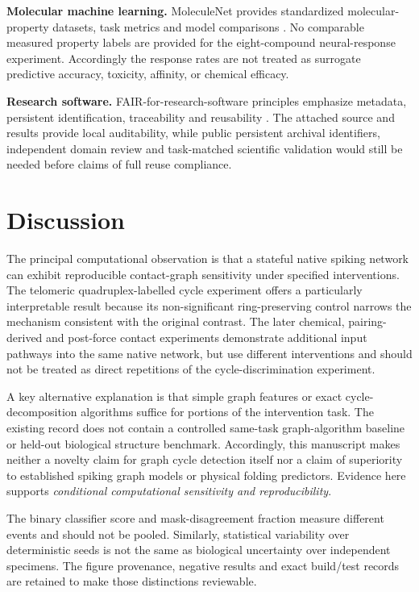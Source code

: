 \documentclass[10pt,a4paper]{article}
\begin{document}
\textbf{Molecular machine learning.} MoleculeNet provides standardized molecular-property datasets, task metrics and model comparisons \cite{MoleculeNet}. No comparable measured property labels are provided for the eight-compound neural-response experiment. Accordingly the response rates are not treated as surrogate predictive accuracy, toxicity, affinity, or chemical efficacy.

\textbf{Research software.} FAIR-for-research-software principles emphasize metadata, persistent identification, traceability and reusability \cite{FAIR4RS}. The attached source and results provide local auditability, while public persistent archival identifiers, independent domain review and task-matched scientific validation would still be needed before claims of full reuse compliance.

\section{Discussion}
The principal computational observation is that a stateful native spiking network can exhibit reproducible contact-graph sensitivity under specified interventions. The telomeric quadruplex-labelled cycle experiment offers a particularly interpretable result because its non-significant ring-preserving control narrows the mechanism consistent with the original contrast. The later chemical, pairing-derived and post-force contact experiments demonstrate additional input pathways into the same native network, but use different interventions and should not be treated as direct repetitions of the cycle-discrimination experiment.

A key alternative explanation is that simple graph features or exact cycle-decomposition algorithms suffice for portions of the intervention task. The existing record does not contain a controlled same-task graph-algorithm baseline or held-out biological structure benchmark. Accordingly, this manuscript makes neither a novelty claim for graph cycle detection itself nor a claim of superiority to established spiking graph models or physical folding predictors. Evidence here supports \emph{conditional computational sensitivity and reproducibility}.

The binary classifier score and mask-disagreement fraction measure different events and should not be pooled. Similarly, statistical variability over deterministic seeds is not the same as biological uncertainty over independent specimens. The figure provenance, negative results and exact build/test records are retained to make those distinctions reviewable.
\end{document}
